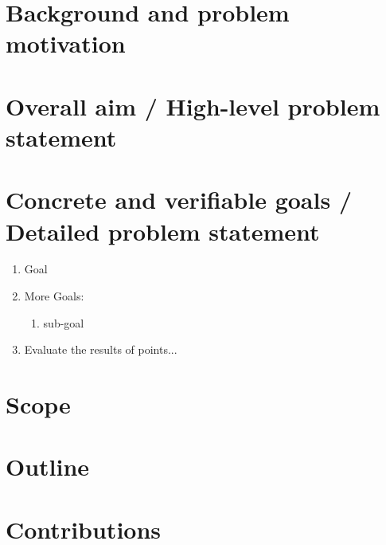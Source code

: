 \section{Background and problem motivation}

\section{Overall aim / High-level problem statement}

\section{Concrete and verifiable goals / Detailed problem statement}
\begin{enumerate}
    \item Goal
    \item More Goals:
    \begin{enumerate}[label*=\arabic*.]
        \item sub-goal
    \end{enumerate} 
    \item Evaluate the results of points...
\end{enumerate}
\section{Scope}

\section{Outline}

\section{Contributions}